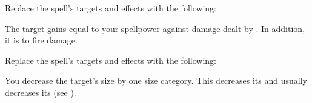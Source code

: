 Replace the spell's targets and effects with the following:
\begin{spellcontent}

\begin{augmenttargetinginfo}



\end{augmenttargetinginfo}


\begin{augmenteffects}



\spelleffect
The target gains  equal to your spellpower against damage dealt by .
In addition, it is  to fire damage.








\end{augmenteffects}

\end{spellcontent}








Replace the spell's targets and effects with the following:
\begin{spellcontent}

\begin{augmenttargetinginfo}



\end{augmenttargetinginfo}


\begin{augmenteffects}



\spelleffect
You decrease the target's size by one size category.
This decreases its  and usually decreases its  (see ).








\end{augmenteffects}

\end{spellcontent}





